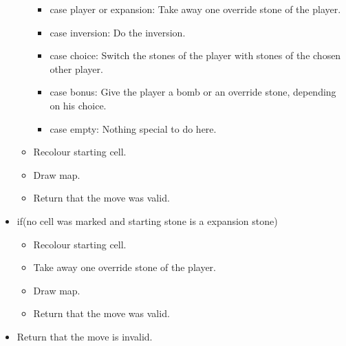 \begin{itemize}
\begin{itemize}
\begin{itemize}
			\item case player or expansion: Take away one override stone of the player.
			\item case inversion: Do the inversion.
			\item case choice: Switch the stones of the player with stones of the chosen other player.
			\item case bonus: Give the player a bomb or an override stone, depending on his choice.
			\item case empty: Nothing special to do here.
		\end{itemize}
		\item Recolour starting cell.
		\item Draw map.
		\item Return that the move was valid.
	\end{itemize}
	\item if(no cell was marked and starting stone is a expansion stone)
	\begin{itemize}
		\item Recolour starting cell.
		\item Take away one override stone of the player.
		\item Draw map.
		\item Return that the move was valid.
	\end{itemize}
	\item Return that the move is invalid.
\end{itemize}
